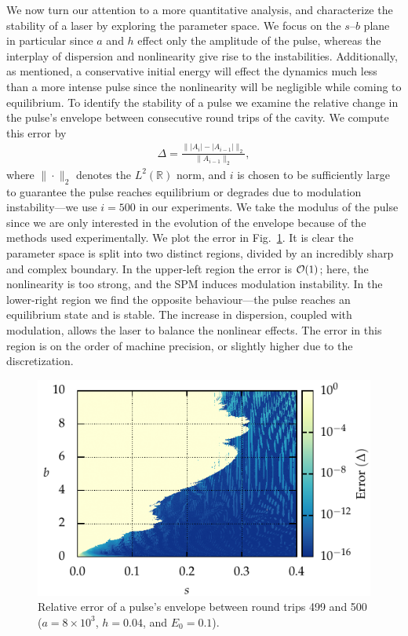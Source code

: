 \documentclass[9pt,twocolumn,twoside]{osajnl}
\let\originalleft\left
\let\originalright\right
\renewcommand{\left}{\mathopen{}\mathclose\bgroup\originalleft}
\renewcommand{\right}{\aftergroup\egroup\originalright}
\providecommand{\bigO}[1]{\ensuremath{\mathop{}\mathopen{}\mathcal{O}\mathopen{}\left(#1\right)}} %
\begin{document}
We now turn our attention to a more quantitative analysis, and characterize the stability of a laser by exploring the parameter space. We focus on the $s$--$b$ plane in particular since $a$ and $h$ effect only the amplitude of the pulse, whereas the interplay of dispersion and nonlinearity give rise to the instabilities. Additionally, as mentioned, a conservative initial energy will effect the dynamics much less than a more intense pulse since the nonlinearity will be negligible while coming to equilibrium. To identify the stability of a pulse we examine the relative change in the pulse's envelope between consecutive round trips of the cavity. We compute this error by
\begin{align}
	\Delta = \frac{\| |A_i| - |A_{i-1}| \|_2}{\| A_{i-1} \|_2},
	\label{eq:error}
\end{align}
where $\| \cdot \|_2$ denotes the $L^2(\mathbb{R})$ norm, and $i$ is chosen to be sufficiently large to guarantee the pulse reaches equilibrium or degrades due to modulation instability---we use $i = 500$ in our experiments. We take the modulus of the pulse since we are only interested in the evolution of the envelope because of the methods used experimentally. We plot the error in Fig.~\ref{fig:error}. It is clear the parameter space is split into two distinct regions, divided by an incredibly sharp and complex boundary. In the upper-left region the error is $\bigO{1}$; here, the nonlinearity is too strong, and the SPM induces modulation instability. In the lower-right region we find the opposite behaviour---the pulse reaches an equilibrium state and is stable. The increase in dispersion, coupled with modulation, allows the laser to balance the nonlinear effects. The error in this region is on the order of machine precision, or slightly higher due to the discretization.

\begin{figure}[tbp]
	\centering
	\includegraphics{Figures/ParamSpaceErr}
	\caption{Relative error of a pulse's envelope between round trips 499 and 500 ($a = 8 \times 10^3$, $h = 0.04$, and $E_0 = 0.1$).}
	\label{fig:error}
\end{figure}
\end{document}
